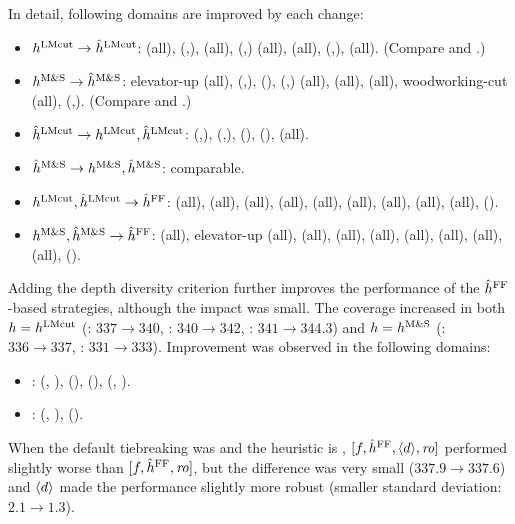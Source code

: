 In detail, following domains are improved by each change:
\begin{itemize}
 \item \textbf{$h^\text{LMcut} \to \hat{h}^\text{LMcut}$}:  (all),  (\fifo,\ro),  (all),  (\lifo,\ro)  (all),  (all),  (\lifo,\ro),  (all). (Compare  and .)
 \item \textbf{$h^\text{M\&S} \to \hat{h}^\text{M\&S}$}: elevator-up (all),  (\fifo,\ro),  (\ro),  (\fifo,\lifo)  (all),  (all),  (all), wood\-working-cut (all),  (\lifo,\ro). (Compare  and .)
 \item \textbf{$\hat{h}^\text{LMcut} \to h^\text{LMcut},\hat{h}^\text{LMcut}$}:  (\fifo,\ro),  (\fifo,\ro),  (\lifo),  (\fifo),  (all).
 \item \textbf{$\hat{h}^\text{M\&S} \to h^\text{M\&S},\hat{h}^\text{M\&S}$}: comparable.
 \item \textbf{$h^\text{LMcut},\hat{h}^\text{LMcut} \to \hat{h}^{\text{FF}}$}:  (all),  (all),  (all),  (all),  (all),  (all),  (all),  (all),  (all),  (\ro).
 \item \textbf{$h^\text{M\&S},\hat{h}^\text{M\&S} \to \hat{h}^{\text{FF}}$}:  (all), elevator-up (all),  (all),  (all),  (all),  (all),  (all),  (all),  (all),  (\ro).
\end{itemize}
 
Adding the depth diversity criterion further improves the performance of the $\hat{h}^{\text{FF}}$-based strategies,
 although the impact was small.
The coverage increased in both
 $h=h^\text{LMcut}$ (\fifo: $337\rightarrow 340$, \lifo: $340\rightarrow 342$, \ro: $341\rightarrow 344.3$) and
 $h=h^\text{M\&S}$ (\fifo: $336\rightarrow 337$, \lifo: $331\rightarrow 333$).
Improvement was observed in the following domains:
\begin{itemize}
 \item \textbf{\lmcut}:  (\lifo, \ro),  (\ro),  (\fifo),  (\fifo, \ro).
 \item \textbf{\mands}:  (\lifo, \ro),  (\fifo).
\end{itemize}
When the default tiebreaking was \ro and the heuristic is \mands, $[f,\hat{h}^{\text{FF}},{\left<d\right>},{\text{\textit{ro}}}]$ performed slightly worse than 
$[f,\hat{h}^{\text{FF}},{\text{\textit{ro}}}]$, but the difference was very small  ($337.9\rightarrow 337.6$) and ${\left<d\right>}$ made the performance slightly more robust (smaller standard deviation: $2.1\rightarrow 1.3$).

